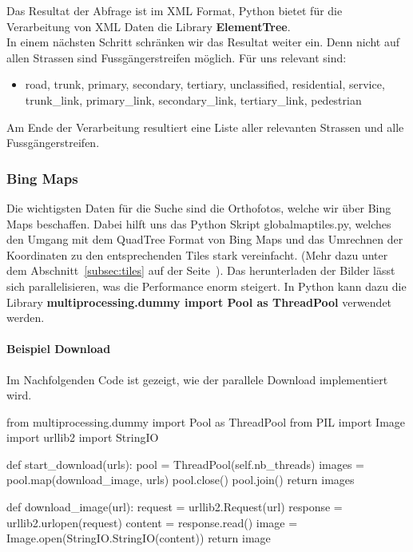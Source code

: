 Das Resultat der Abfrage ist im XML Format, Python bietet für die Verarbeitung von XML Daten die Library \textbf{ElementTree}.\\
In einem nächsten Schritt schränken wir das Resultat weiter ein. Denn nicht auf allen Strassen sind Fussgängerstreifen möglich. Für uns relevant sind:
\begin{itemize}
	\item road, trunk, primary, secondary, tertiary, unclassified, residential, service, trunk\_link, primary\_link, secondary\_link, tertiary\_link, pedestrian
\end{itemize}

Am Ende der Verarbeitung resultiert eine Liste aller relevanten Strassen und alle Fussgängerstreifen.

\subsubsection{Bing Maps}
Die wichtigsten Daten für die Suche sind die Orthofotos, welche wir über Bing Maps beschaffen. Dabei hilft uns das Python Skript globalmaptiles.py, welches den Umgang mit dem QuadTree Format von Bing Maps und das Umrechnen der Koordinaten zu den entsprechenden Tiles stark vereinfacht. (Mehr dazu unter dem Abschnitt~\ref{subsec:tiles} auf der Seite~\pageref{subsec:tiles}). Das herunterladen der Bilder lässt sich parallelisieren, was die Performance enorm steigert. In Python kann dazu die Library \textbf{multiprocessing.dummy import Pool as ThreadPool} verwendet werden.

\paragraph{Beispiel Download} Im Nachfolgenden Code ist gezeigt, wie der parallele Download implementiert wird. \\
\begin{python}
from multiprocessing.dummy import Pool as ThreadPool
from PIL import Image
import urllib2
import StringIO

def start_download(urls):
     pool = ThreadPool(self.nb_threads)       
     images = pool.map(download_image, urls)
     pool.close()
     pool.join()
     return images

def download_image(url):
    request = urllib2.Request(url)
    response = urllib2.urlopen(request)
    content = response.read()
    image = Image.open(StringIO.StringIO(content))
    return image

\end{python}

